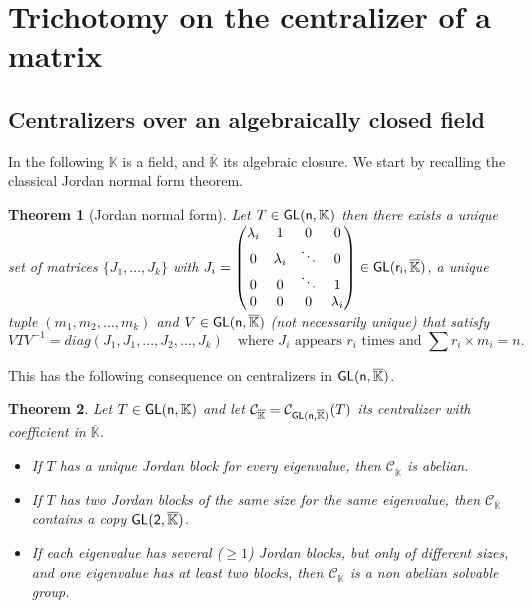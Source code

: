 \documentclass[a4paper,11pt]{article}
\newtheorem{theorem}{Theorem}[section]
\theoremstyle{definition}
\newcommand{\C}{\mathcal C}
\newcommand{\K}{\mathbb K}
\def \GL{\sf{GL}}
\begin{document}
\section{Trichotomy on the centralizer of a matrix}

\subsection{Centralizers over an algebraically closed field}

In the following $\mathbb{K}$ is a field, and
$\overline{\mathbb{K}}$ its algebraic closure. We start by recalling the classical Jordan normal form theorem. 

\begin{theorem}[Jordan normal form]
Let $T \in \GL(n,\K)$ then there exists a unique set of matrices $\{J_1,...,    J_k\} $  with $J_i =\begin{pmatrix}
\lambda_i & 1& 0 & 0 \\
0 & \lambda_i & \ddots & 0\\
0 & 0 & \ddots & 1  \\
 0&  0  &  0& \lambda_i
\end{pmatrix} \in \GL(r_i,\overline{\K})$, a unique tuple $(m_1,m_2,...,m_k)$ and $V \in \GL(n,\overline{\K})$ (not necessarily unique) that satisfy 
$$ VTV^{-1}=diag(J_1,J_1,...,J_2,...,J_k) \quad \text{where $J_i$ appears $r_i$ times and $\sum r_{i}\times{m_i}=n$} .$$

\end{theorem}

This has the following consequence on centralizers in $ \GL(n,
 \overline{\mathbb{K}})$.


\begin{theorem}\label{theorem3.1}
\label{derog}
Let $T \in \GL(n, \K)$ and let $\C_{\overline{\K}}=\C_{\GL(n,\overline{\K})}(T)$ its centralizer with coefficient in $\overline{\K}$.

\begin{itemize}
\item[\rm (a)]
If $T$ has a unique Jordan block for every eigenvalue, then $\C_{\overline{\K}}$ is abelian.
\item[\rm (b)]
If $T$ has two Jordan blocks of the same size for the same eigenvalue, then $\C_{\overline{\K}}$ contains a copy $\GL(2,\overline{\K})$.
\item[\rm (c)]
If  each eigenvalue has several ($\geq 1$) Jordan blocks, but only of different sizes, and one eigenvalue has at least two blocks,  then $\C_{\overline{\K}}$ is a non abelian solvable group.
\end{itemize}
\end{theorem}
\end{document}

